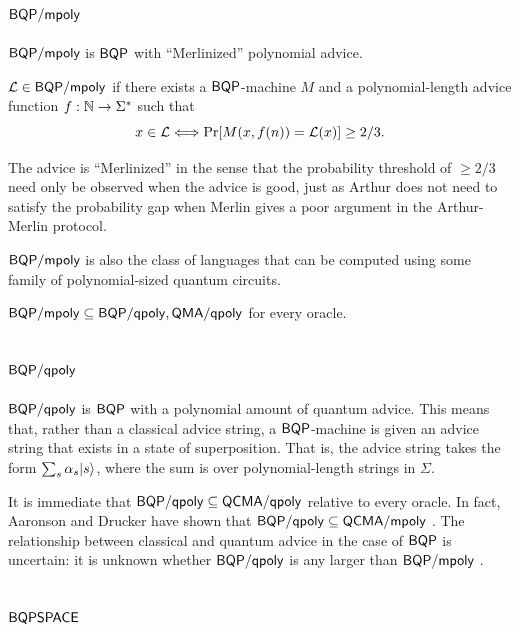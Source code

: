 \subsection{$\mathsf{BQP}/\mathsf{mpoly}$}\label{bqp-mpoly}

$\mathsf{BQP}/\mathsf{mpoly}$ is $\mathsf{BQP}$ with ``Merlinized'' polynomial advice.
\begin{definition}
$\mathcal{L}\in\mathsf{BQP}/\mathsf{mpoly}$ if there exists a $\mathsf{BQP}$-machine $M$ and a
polynomial-length advice function $f:\mathbb{N}\rightarrow\Sigma^*$ such that
\[
x\in\mathcal{L}\Longleftrightarrow\Pr[M(x,f(n))=\mathcal{L}(x)]\geq 2/3.
\]
\end{definition}
The advice is ``Merlinized'' in the sense that the probability threshold of $\geq 
2/3$ need only be observed when the advice is good, just as Arthur does not need 
to satisfy the probability gap when Merlin gives a poor argument in the 
Arthur-Merlin protocol.

$\mathsf{BQP}/\mathsf{mpoly}$ is also the class of languages that can be computed using 
some family of polynomial-sized quantum circuits.

$\mathsf{BQP}/\mathsf{mpoly}\subseteq\mathsf{BQP}/\mathsf{qpoly},\mathsf{QMA}/\mathsf{qpoly}$ for 
every oracle.

\subsection{$\mathsf{BQP}/\mathsf{qpoly}$}

$\mathsf{BQP}/\mathsf{qpoly}$ is $\mathsf{BQP}$ with a polynomial amount of quantum 
advice. This means that, rather than a classical advice string, a 
$\mathsf{BQP}$-machine is given an advice string that 
exists in a state of superposition. That is, the advice string takes the form 
$\sum_s\alpha_s|s\rangle$, where the sum is over polynomial-length strings in 
$\Sigma$.

It is immediate that $\mathsf{BQP}/\mathsf{qpoly}\subseteq\mathsf{QCMA}/\mathsf{qpoly}$ 
relative to every oracle. In fact, Aaronson and Drucker have shown that 
$\mathsf{BQP}/\mathsf{qpoly}\subseteq\mathsf{QCMA}/\mathsf{mpoly}$ 
\cite{aaronson2010characterization}. The relationship between classical and quantum
advice in the case of $\mathsf{BQP}$ is uncertain: it is unknown whether 
$\mathsf{BQP}/\mathsf{qpoly}$ is any larger than $\mathsf{BQP}/\mathsf{mpoly}$ 
\cite{aaronson2007quantum}.

\subsection{$\mathsf{BQPSPACE}$}

